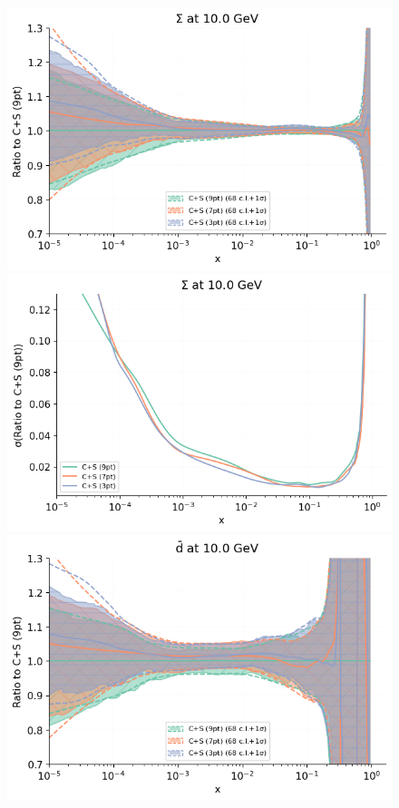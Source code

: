 \begin{figure}[H]
\begin{center}
        \includegraphics[scale=0.45]{mhous/plots/jplots/j2sig.png}
    \includegraphics[scale=0.45]{mhous/plots/jplots/jesigma.png}
       \includegraphics[scale=0.45]{mhous/plots/jplots/j2d.png}

\end{center}
\end{figure}
